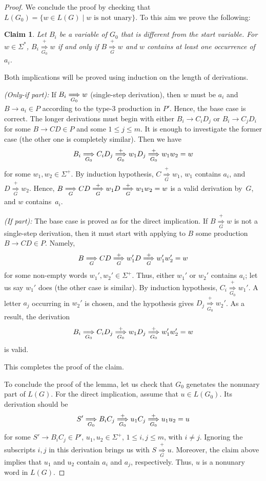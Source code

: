 \documentclass[11pt]{article}
\newcommand{\derivesForm}[2]{\mathrel{\underset{\scriptstyle #1}{\overset{\scriptstyle #2}{\Longrightarrow}}}}
\newcommand{\DerivesGrammar}[1]{\derivesForm{#1}{+}}
\newcommand{\DERIVESGrammar}[2]{\derivesForm{#1}{#2}}
\newcommand{\derGrammar}[1]{\DERIVESGrammar{#1}{}}
\newcommand{\DerivesG}{\DerivesGrammar{G}}
\newcommand{\derG}{\derGrammar{G}}
\newcommand{\DerivesZ}{\DerivesGrammar{G_0}}
\newcommand{\derZ}{\derGrammar{G_0}}
\newtheorem*{claim}{Claim}     \newtheorem{ex}[theorem]{Example}
\begin{document}
\begin{proof}
\noindent
We conclude the proof by checking that $L(G_0)\!=\!\{w \in L(G)\!\mid\!\mbox{$w$ is not unary}\}$. 
To this aim we prove the following:


\begin{claim}
	Let $B_i$ be a variable of $G_0$ that is different {}from the start variable. 
	For~$w \in \Sigma^*$, $B_i \DerivesZ w$ if and only if $B \DerivesG w$ and $w$ contains 
	at least one occurrence of~$a_i$. 
\end{claim}
\noindent
	Both implications will be proved using induction on the length of derivations. 

\smallskip

	\emph{(Only-if part):} 
	If $B_i \derZ w$ (single-step derivation), then $w$ must be $a_i$ and $B \to a_i \in P$ according to the type-3 production in $P'$. 
	Hence, the base case is correct. 
	The longer derivations must begin with either $B_i \to C_i D_j$ or $B_i \to C_j D_i$ for some $B \to CD \in P$ and some $1 \le j \le m$. 
	It is enough to investigate the former case (the other one is completely similar). 
	Then we have
	\[B_i \derZ C_i D_j \DerivesZ w_1 D_j \DerivesZ w_1 w_2 = w\]
  for some $w_1, w_2 \in \Sigma^+$. 
	By induction hypothesis, $C \DerivesG w_1$, $w_1$ contains $a_i$, and $D \DerivesG w_2$. 
	Hence, $B \derG CD \DerivesG w_1 D \DerivesG w_1 w_2 = w$ is a valid derivation by~$G$, and $w$ contains~$a_i$.

\smallskip

	\emph{(If part):} 
	The base case is proved as for the direct implication. 
	If $B \DerivesG w$ is not a single-step derivation, then it must start with applying to $B$ some production $B \to CD \in P$. 
	Namely,
	\[B \derG CD \DerivesG w_1' D \DerivesG w_1' w_2' = w
	\] 
	for some non-empty words $w_1', w_2' \in \Sigma^+$. 
	Thus, either $w_1'$ or $w_2'$ contains $a_i$; let us say $w_1'$ does (the other case is similar).
	By induction hypothesis, $C_i \DerivesZ w_1'$. 
	A letter $a_j$ occurring in $w_2'$ is chosen, and the hypothesis gives $D_j \DerivesZ w_2'$. 
	As a result, the derivation 
	\[B_i \derZ C_i D_j \DerivesZ w_1 D_j \DerivesZ w_1' w_2' = w
	\] 
	is valid. 


This completes the proof of the claim.

\medskip

To conclude the proof of the lemma, let us check that $G_0$ genetates the nonunary part of $L(G)$. 
For the direct implication, assume that $u \in L(G_0)$. 
Its derivation should be 
\[S' \derZ B_i C_j \DerivesZ u_1 C_j \DerivesZ u_1 u_2 = u
\]
for some $S' \to B_i C_j \in P'$, $u_1, u_2 \in \Sigma^+$, $1\leq i,j\leq m$, with $i\neq j$. 
Ignoring the subscripts $i, j$ in this derivation brings us with $S \DerivesG u$. 
Moreover, the claim above implies that $u_1$ and $u_2$ contain $a_i$ and $a_j$, respectively. 
Thus, $u$ is a nonunary word in $L(G)$. 


\end{proof}
\end{document}

